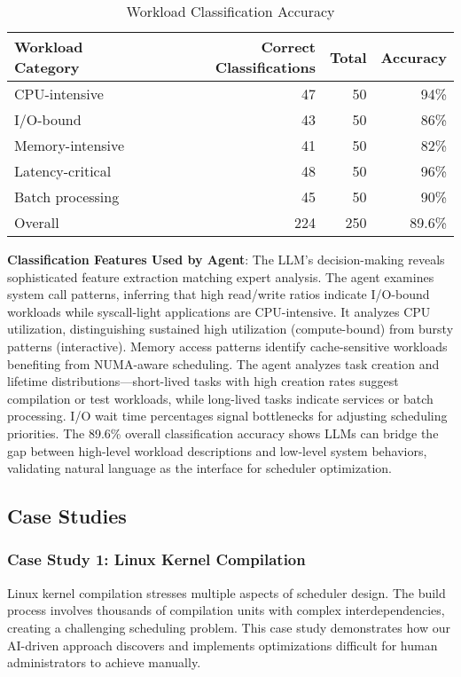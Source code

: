 \begin{table}[h]
\caption{Workload Classification Accuracy}
\label{tab:workload-understanding}
\begin{tabular}{lrrr}
\toprule
Workload Category & Correct Classifications & Total & Accuracy \\
\midrule
CPU-intensive & 47 & 50 & 94\% \\
I/O-bound & 43 & 50 & 86\% \\
Memory-intensive & 41 & 50 & 82\% \\
Latency-critical & 48 & 50 & 96\% \\
Batch processing & 45 & 50 & 90\% \\
\midrule
Overall & 224 & 250 & 89.6\% \\
\bottomrule
\end{tabular}
\end{table}

\textbf{Classification Features Used by Agent}: The LLM's decision-making reveals sophisticated feature extraction matching expert analysis. The agent examines system call patterns, inferring that high read/write ratios indicate I/O-bound workloads while syscall-light applications are CPU-intensive. It analyzes CPU utilization, distinguishing sustained high utilization (compute-bound) from bursty patterns (interactive). Memory access patterns identify cache-sensitive workloads benefiting from NUMA-aware scheduling. The agent analyzes task creation and lifetime distributions—short-lived tasks with high creation rates suggest compilation or test workloads, while long-lived tasks indicate services or batch processing. I/O wait time percentages signal bottlenecks for adjusting scheduling priorities. The 89.6\% overall classification accuracy shows LLMs can bridge the gap between high-level workload descriptions and low-level system behaviors, validating natural language as the interface for scheduler optimization.

\subsection{Case Studies}

\subsubsection{Case Study 1: Linux Kernel Compilation}

Linux kernel compilation stresses multiple aspects of scheduler design. The build process involves thousands of compilation units with complex interdependencies, creating a challenging scheduling problem. This case study demonstrates how our AI-driven approach discovers and implements optimizations difficult for human administrators to achieve manually.

